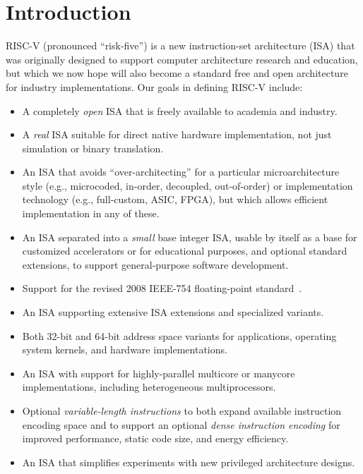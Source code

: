 \chapter{Introduction}

RISC-V (pronounced ``risk-five'') is a new instruction-set
architecture (ISA) that was originally designed to support computer
architecture research and education, but which we now hope will also
become a standard free and open architecture for industry
implementations.  Our goals in defining RISC-V include:
\vspace{-0.1in}
\begin{itemize}
\parskip 0pt
\itemsep 1pt
\item A completely {\em open} ISA that is freely available to
  academia and industry.
\item A {\em real} ISA suitable for direct native hardware implementation,
  not just simulation or binary translation.
\item An ISA that avoids ``over-architecting'' for a particular
  microarchitecture style (e.g., microcoded, in-order, decoupled,
  out-of-order) or implementation technology (e.g., full-custom, ASIC,
  FPGA), but which allows efficient implementation in any of these.
\item An ISA separated into a {\em small} base integer ISA, usable by
  itself as a base for customized accelerators or for educational
  purposes, and optional standard extensions, to support
  general-purpose software development.
\item Support for the revised 2008 IEEE-754 floating-point standard~\cite{ieee754-2008}.
\item An ISA supporting extensive ISA extensions and
  specialized variants.
\item Both 32-bit and 64-bit address space variants for
  applications, operating system kernels, and hardware implementations.
\item An ISA with support for highly-parallel multicore
  or manycore implementations, including heterogeneous multiprocessors.
\item Optional {\em variable-length instructions} to both expand available
  instruction encoding space and to support an optional {\em dense
  instruction encoding} for improved performance, static code size,
  and energy efficiency.
\item An ISA that simplifies experiments with new privileged architecture designs.
\end{itemize}
\vspace{-0.1in}


